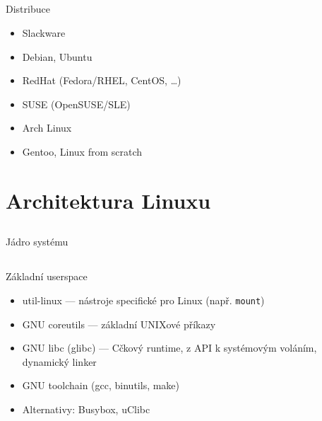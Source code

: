 \documentclass{beamer}
\begin{document}
\subsection{}
\begin{frame}{Distribuce}
\begin{itemize}
\item Slackware
\item Debian, Ubuntu
\item RedHat (Fedora/RHEL, CentOS, \dots)
\item SUSE (OpenSUSE/SLE)
\item Arch Linux
\item Gentoo, Linux from scratch
\end{itemize}
\end{frame}


\section{Architektura Linuxu}

\subsection{}
\begin{frame}{Jádro systému}
\end{frame}

\subsection{}
\begin{frame}{Základní userspace}
\begin{itemize}
\item util-linux --- nástroje specifické pro Linux (např. {\tt mount})
\item GNU coreutils --- základní UNIXové příkazy
\item GNU libc (glibc) --- Cčkový runtime, z API k systémovým voláním, dynamický linker
\item GNU toolchain (gcc, binutils, make)
\item Alternativy: Busybox, uClibc
\end{itemize}
\end{frame}
\end{document}
